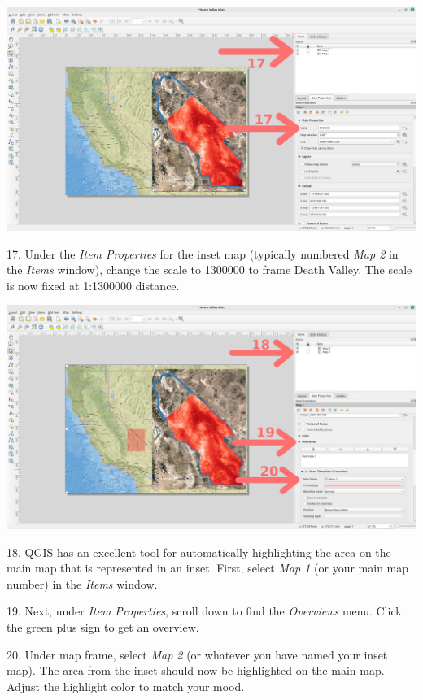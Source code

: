 \documentclass[oneside,a4paper,11pt,explicit]{book}
\begin{document}
\vspace{.25em}

\centerline{\includegraphics[width=\textwidth]{AddInset.png}}

17. Under the \textit{Item Properties} for the inset map (typically numbered \textit{Map 2} in the \textit{Items} window), change the scale to 1300000 to frame Death Valley. The scale is now fixed at 1:1300000 distance.

\vspace{.25em}

\centerline{\includegraphics[width=\textwidth]{RegionShade.png}}

18. QGIS has an excellent tool for automatically highlighting the area on the main map that is represented in an inset. First, select \textit{Map 1} (or your main map number) in the \textit{Items} window.
 
19. Next, under \textit{Item Properties}, scroll down to find the \textit{Overviews} menu. Click the green plus sign to get an overview.

20. Under map frame, select \textit{Map 2} (or whatever you have named your inset map). The area from the inset should now be highlighted on the main map. Adjust the highlight color to match your mood.
\end{document}
